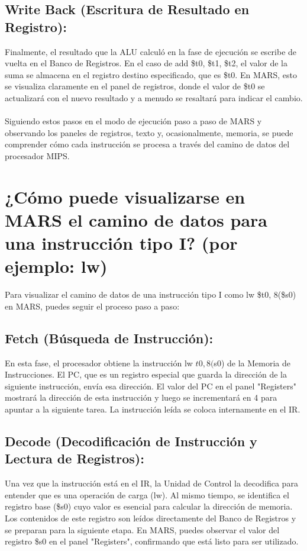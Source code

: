 \documentclass{article}
\begin{document}
\subsection{Write Back (Escritura de Resultado en Registro): }
Finalmente, el resultado que la ALU calculó en la fase de ejecución se escribe de vuelta en el Banco de Registros. En el caso de add \$t0, \$t1, \$t2, el valor de la suma se almacena en el registro destino especificado, que es \$t0. En MARS, esto se visualiza claramente en el panel de registros, donde el valor de \$t0 se actualizará con el nuevo resultado y a menudo se resaltará para indicar el cambio.
\\
\\Siguiendo estos pasos en el modo de ejecución paso a paso de MARS y observando los paneles de registros, texto y, ocasionalmente, memoria, se puede comprender cómo cada instrucción se procesa a través del camino de datos del procesador MIPS.
\section{¿Cómo puede visualizarse en MARS el camino de datos para una instrucción tipo I? (por ejemplo: lw)}
Para visualizar el camino de datos de una instrucción tipo I como lw \$t0, 8(\$s0) en MARS, puedes seguir el proceso paso a paso:

\subsection{Fetch (Búsqueda de Instrucción): }
En esta fase, el procesador obtiene la instrucción lw $t0, 8($s0) de la Memoria de Instrucciones. El PC, que es un registro especial que guarda la dirección de la siguiente instrucción, envía esa dirección. El valor del PC en el panel "Registers" mostrará la dirección de esta instrucción y luego se incrementará en 4 para apuntar a la siguiente tarea. La instrucción leída se coloca internamente en el IR.
\subsection{Decode (Decodificación de Instrucción y Lectura de Registros): }
 Una vez que la instrucción está en el IR, la Unidad de Control la decodifica para entender que es una operación de carga (lw). Al mismo tiempo, se identifica el registro base (\$s0) cuyo valor es esencial para calcular la dirección de memoria. Los contenidos de este registro son leídos directamente del Banco de Registros y se preparan para la siguiente etapa. En MARS, puedes observar el valor del registro \$s0 en el panel "Registers", confirmando que está listo para ser utilizado.
\end{document}
